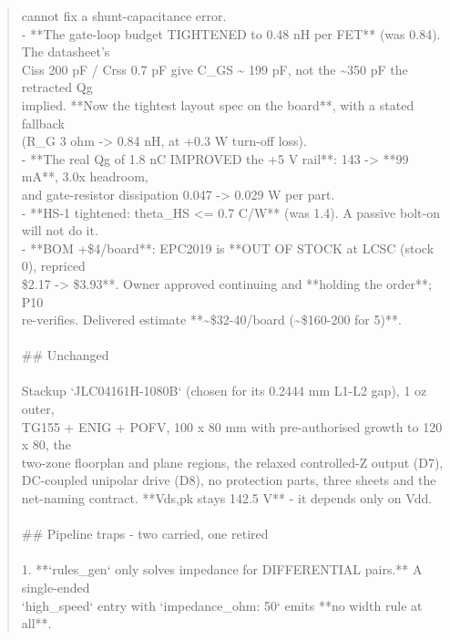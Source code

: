 \documentclass[11pt,a4paper]{article}
\begin{document}
\begin{quote}
  cannot fix a shunt-capacitance error.\\
- {*}{*}The gate-loop budget TIGHTENED to 0.48 nH per FET{*}{*} (was 0.84). The datasheet's\\
  Ciss 200 pF / Crss 0.7 pF give C\_GS \textasciitilde{} 199 pF, not the \textasciitilde{}350 pF the retracted Qg\\
  implied. {*}{*}Now the tightest layout spec on the board{*}{*}, with a stated fallback\\
  (R\_G 3 ohm -\textgreater{} 0.84 nH, at +0.3 W turn-off loss).\\
- {*}{*}The real Qg of 1.8 nC IMPROVED the +5 V rail{*}{*}: 143 -\textgreater{} {*}{*}99 mA{*}{*}, 3.0x headroom,\\
  and gate-resistor dissipation 0.047 -\textgreater{} 0.029 W per part.\\
- {*}{*}HS-1 tightened: theta\_HS \textless{}= 0.7 C/W{*}{*} (was 1.4). A passive bolt-on will not do it.\\
- {*}{*}BOM +\$4/board{*}{*}: EPC2019 is {*}{*}OUT OF STOCK at LCSC (stock 0), repriced\\
  \$2.17 -\textgreater{} \$3.93{*}{*}. Owner approved continuing and {*}{*}holding the order{*}{*}; P10\\
  re-verifies. Delivered estimate {*}{*}\textasciitilde{}\$32-40/board (\textasciitilde{}\$160-200 for 5){*}{*}.\\
~\\
\#\# Unchanged\\
~\\
Stackup `JLC04161H-1080B` (chosen for its 0.2444 mm L1-L2 gap), 1 oz outer,\\
TG155 + ENIG + POFV, 100 x 80 mm with pre-authorised growth to 120 x 80, the\\
two-zone floorplan and plane regions, the relaxed controlled-Z output (D7),\\
DC-coupled unipolar drive (D8), no protection parts, three sheets and the\\
net-naming contract. {*}{*}Vds,pk stays 142.5 V{*}{*} - it depends only on Vdd.\\
~\\
\#\# Pipeline traps - two carried, one retired\\
~\\
1. {*}{*}`rules\_gen` only solves impedance for DIFFERENTIAL pairs.{*}{*} A single-ended\\
   `high\_speed` entry with `impedance\_ohm: 50` emits {*}{*}no width rule at all{*}{*}.\\

\end{quote}
\end{document}
